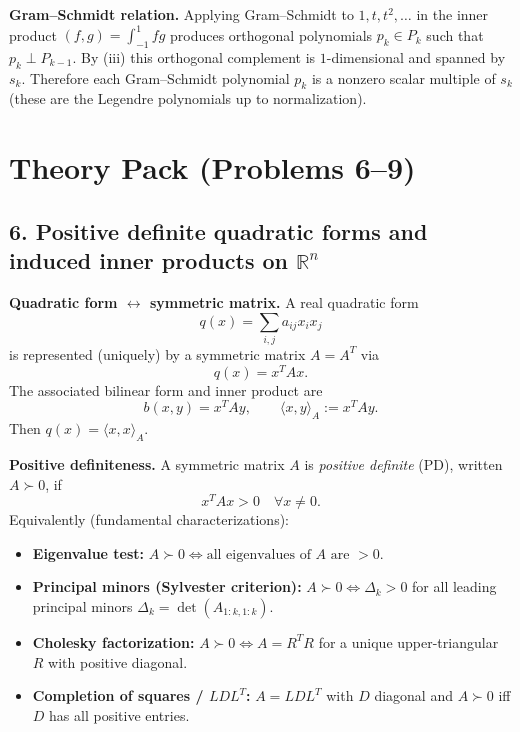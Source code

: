 \documentclass[12pt,a4paper]{article}
\theoremstyle{plain}
\theoremstyle{definition}      %
\begin{document}
\textbf{Gram--Schmidt relation.}
Applying Gram--Schmidt to $1,t,t^2,\dots$ in the inner product $(f,g)=\int_{-1}^{1}fg$
produces orthogonal polynomials $p_k\in P_k$ such that $p_k\perp P_{k-1}$.
By (iii) this orthogonal complement is $1$-dimensional and spanned by $s_k$.
Therefore each Gram--Schmidt polynomial $p_k$ is a nonzero scalar multiple of $s_k$
(these are the Legendre polynomials up to normalization).



\section*{Theory Pack (Problems 6--9)}

\subsection*{6. Positive definite quadratic forms and induced inner products on $\mathbb R^n$}

\textbf{Quadratic form $\leftrightarrow$ symmetric matrix.}
A real quadratic form
\[
q(x)=\sum_{i,j} a_{ij}x_ix_j
\]
is represented (uniquely) by a symmetric matrix $A=A^T$ via
\[
q(x)=x^T A x.
\]
The associated bilinear form and inner product are
\[
b(x,y)=x^T A y,\qquad \langle x,y\rangle_A:=x^T A y.
\]
Then $q(x)=\langle x,x\rangle_A$.

\textbf{Positive definiteness.}
A symmetric matrix $A$ is \emph{positive definite} (PD), written $A\succ 0$, if
\[
x^T A x>0 \quad \forall x\neq 0.
\]
Equivalently (fundamental characterizations):
\begin{itemize}
	\item \textbf{Eigenvalue test:} $A\succ 0 \iff \text{all eigenvalues of $A$ are $>0$}$.
	\item \textbf{Principal minors (Sylvester criterion):}
	$A\succ 0 \iff \Delta_k>0$ for all leading principal minors $\Delta_k=\det(A_{1:k,1:k})$.
	\item \textbf{Cholesky factorization:} $A\succ 0 \iff A=R^TR$ for a unique upper-triangular $R$ with positive diagonal.
	\item \textbf{Completion of squares / $LDL^T$:} $A=L D L^T$ with $D$ diagonal and $A\succ0$ iff $D$ has all positive entries.
\end{itemize}
\end{document}
